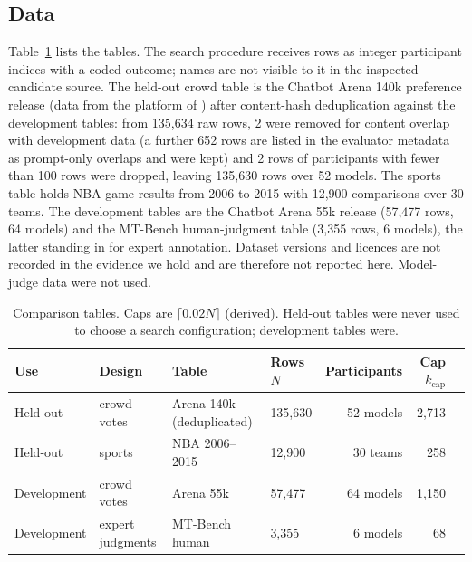 \documentclass{article}
\newcommand{\kcap}{k_{\mathrm{cap}}}
\begin{document}
\subsection{Data}\label{sec:data}
Table~\ref{tab:data} lists the tables. The search procedure receives rows as integer participant indices with a coded outcome; names are not visible to it in the inspected candidate source. The held-out crowd table is the Chatbot Arena 140k preference release (data from the platform of \citealp{https://doi.org/10.48550/arxiv.2403.04132}) after content-hash deduplication against the development tables: from 135,634 raw rows, 2 were removed for content overlap with development data (a further 652 rows are listed in the evaluator metadata as prompt-only overlaps and were kept) and 2 rows of participants with fewer than 100 rows were dropped, leaving 135,630 rows over 52 models. The sports table holds NBA game results from 2006 to 2015 with 12,900 comparisons over 30 teams. The development tables are the Chatbot Arena 55k release (57,477 rows, 64 models) and the MT-Bench human-judgment table (3,355 rows, 6 models), the latter standing in for expert annotation. Dataset versions and licences are not recorded in the evidence we hold and are therefore not reported here. Model-judge data were not used.

\begin{table}[t]
\centering
\caption{Comparison tables. Caps are $\lceil 0.02N\rceil$ (derived). Held-out tables were never used to choose a search configuration; development tables were.}
\label{tab:data}
\small
\begin{tabular}{llllrrr}
\toprule
Use & Design & Table & Rows $N$ & Participants & Cap $\kcap$\\
\midrule
Held-out & crowd votes & Arena 140k (deduplicated) & 135,630 & 52 models & 2,713\\
Held-out & sports & NBA 2006--2015 & 12,900 & 30 teams & 258\\
Development & crowd votes & Arena 55k & 57,477 & 64 models & 1,150\\
Development & expert judgments & MT-Bench human & 3,355 & 6 models & 68\\
\bottomrule
\end{tabular}
\end{table}
\end{document}
